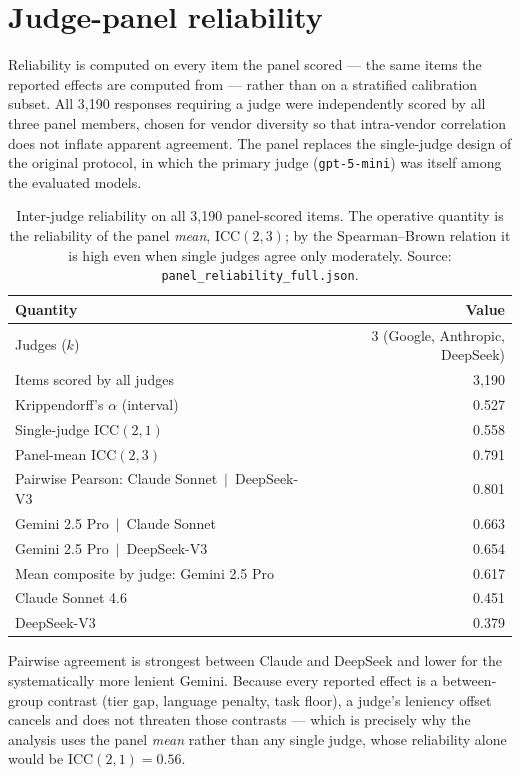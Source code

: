 \documentclass[11pt,a4paper]{article}
\begin{document}
\section{Judge-panel reliability}\label{sec:s-reliability}

Reliability is computed on every item the panel scored --- the same items the
reported effects are computed from --- rather than on a stratified calibration
subset. All 3{,}190 responses requiring a judge were independently scored by all
three panel members, chosen for vendor diversity so that intra-vendor correlation
does not inflate apparent agreement. The panel replaces the single-judge design of
the original protocol, in which the primary judge (\texttt{gpt-5-mini}) was itself
among the evaluated models.

\begin{table}[h]\centering
\caption{Inter-judge reliability on all 3{,}190 panel-scored items. The operative
quantity is the reliability of the panel \emph{mean}, ICC$(2,3)$; by the
Spearman--Brown relation it is high even when single judges agree only moderately.
Source: \texttt{panel\_reliability\_full.json}.}
\label{tab:s-reliability}
\small
\begin{tabular}{lr}
\toprule
Quantity & Value \\
\midrule
Judges ($k$) & 3 (Google, Anthropic, DeepSeek) \\
Items scored by all judges & 3{,}190 \\
Krippendorff's $\alpha$ (interval) & 0.527 \\
Single-judge ICC$(2,1)$ & 0.558 \\
Panel-mean ICC$(2,3)$ & 0.791 \\
\midrule
Pairwise Pearson: Claude Sonnet $\,\vert\,$ DeepSeek-V3 & 0.801 \\
\quad Gemini 2.5 Pro $\,\vert\,$ Claude Sonnet & 0.663 \\
\quad Gemini 2.5 Pro $\,\vert\,$ DeepSeek-V3 & 0.654 \\
\midrule
Mean composite by judge: Gemini 2.5 Pro & 0.617 \\
\quad Claude Sonnet 4.6 & 0.451 \\
\quad DeepSeek-V3 & 0.379 \\
\bottomrule
\end{tabular}
\end{table}

Pairwise agreement is strongest between Claude and DeepSeek and lower for the
systematically more lenient Gemini. Because every reported effect is a
between-group contrast (tier gap, language penalty, task floor), a judge's
leniency offset cancels and does not threaten those contrasts --- which is
precisely why the analysis uses the panel \emph{mean} rather than any single
judge, whose reliability alone would be ICC$(2,1)=0.56$.
\end{document}
